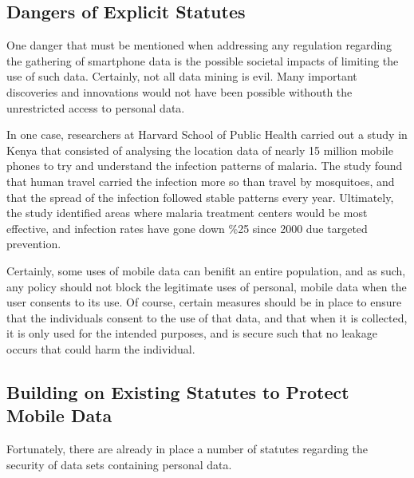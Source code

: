 	\subsection{Dangers of Explicit Statutes} 

One danger that must be mentioned when addressing any regulation regarding the gathering of smartphone data is the possible societal impacts of limiting the use of such data. Certainly, not all data mining is evil. Many important discoveries and innovations would not have been possible withouth the unrestricted access to personal data. 

In one case, researchers at Harvard School of Public Health carried out a study in Kenya that consisted of analysing the location data of nearly 15 million mobile phones to try and understand the infection patterns of malaria\cite{unlock}. The study found that human travel carried the infection more so than travel by mosquitoes, and that the spread of the infection followed stable patterns every year. Ultimately, the study identified areas where malaria treatment centers would be most effective, and infection rates have gone down \%25 since 2000 due targeted prevention. 

Certainly, some uses of mobile data can benifit an entire population, and as such, any policy should not block the legitimate uses of personal, mobile data when the user consents to its use. Of course, certain measures should be in place to ensure that the individuals consent to the use of that data, and that when it is collected, it is only used for the intended purposes, and is secure such that no leakage occurs that could harm the individual. 


	\subsection{Building on Existing Statutes to Protect Mobile Data}

Fortunately, there are already in place a number of statutes regarding the security of data sets containing personal data. 